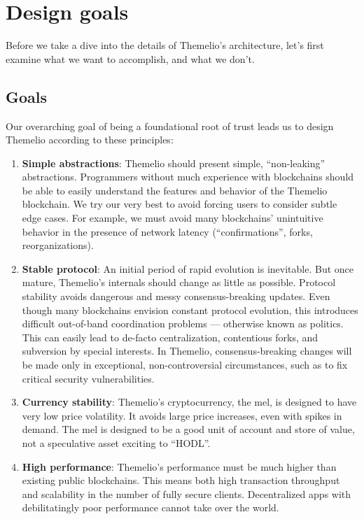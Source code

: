\documentclass[headinclude]{scrbook}
\begin{document}
\section{Design goals}

Before we take a dive into the details of Themelio's architecture, let's first examine what we want to accomplish, and what we don't.

\subsection{Goals}

Our overarching goal of being a foundational root of trust leads us to design Themelio according to these principles:

\begin{enumerate}
    \item \textbf{Simple abstractions}: Themelio should present simple, ``non-leaking'' abstractions. Programmers without much experience with blockchains should be able to easily understand the features and behavior of the Themelio blockchain. We try our very best to avoid forcing users to consider subtle edge cases. For example, we must avoid many blockchains' unintuitive behavior in the presence of network latency (``confirmations'', forks, reorganizations).
    \item \textbf{Stable protocol}: An initial period of rapid evolution is inevitable. But once mature, Themelio's internals should change as little as possible. Protocol stability avoids dangerous and messy consensus-breaking updates. Even though many blockchains envision constant protocol evolution, this introduces difficult out-of-band coordination problems --- otherwise known as politics.  This can easily lead to de-facto centralization, contentious forks, and subversion by special interests. In Themelio, consensus-breaking changes will be made only in exceptional, non-controversial circumstances, such as to fix critical security vulnerabilities.
    \item \textbf{Currency stability}: Themelio's cryptocurrency, the mel, is designed to have very low price volatility. It avoids large price increases, even with spikes in demand. The mel is designed to be a good unit of account and store of value, not a speculative asset exciting to ``HODL''.
    \item \textbf{High performance}: Themelio's performance must be much higher than existing public blockchains. This means both high transaction throughput and scalability in the number of fully secure clients. Decentralized apps with debilitatingly poor performance cannot take over the world.

\end{enumerate}
\end{document}
